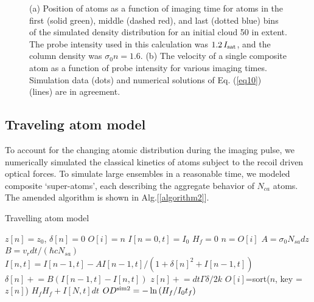 \documentclass[12pt]{iopart}
\begin{document}
\begin{figure}
\caption{(a) Position of atoms as a function of imaging time for atoms in the first (solid green), middle (dashed red), and last (dotted blue) bins of the simulated density distribution for an initial cloud 50 \um{} in extent. The probe intensity used in this calculation was $1.2\, I_{\rm{sat}}$, and the column density was $\sigma_0 n=1.6$. (b) The velocity of a single composite atom as a function of probe intensity for various imaging times. Simulation data (dots) and numerical  solutions of Eq. (\ref{eq10}) (lines) are in agreement.}  
\label{fig:simTests}
\end{figure}

\subsection{Traveling atom model}
To account for the changing atomic distribution during the imaging pulse, we numerically simulated the classical kinetics of atoms subject to the recoil driven optical forces. To simulate large ensembles in a reasonable time, we modeled composite `super-atoms', each describing the aggregate behavior of $N_{ca}$ atoms. The amended algorithm is shown in Alg.[\ref{algorithm2}]. 
\begin{algorithm}
\caption{Travelling atom model}
\label{algorithm2}
\begin{algorithmic}
\STATE $z[n]=z_0$, $\delta[n]=0$ 
\STATE $O[i]=n$ 
\STATE $I[n=0,t]=I_0$  
\STATE $H_f=0$ 
\STATE $n=O[i]$ 
 \STATE $A=\sigma_0 N_{sa} dz$ 
 \STATE $B=v_r dt/(\hbar c  N_{sa})$  
\STATE $I[n,t]=I[n-1,t] - A I[n-1,t]/(1+\delta[n]^2+I[n-1,t])$  
\STATE $\delta[n]\mathrel{+}=B\left(I[n-1,t]-I[n,t]\right)$   
\STATE $z[n]\mathrel{+}=dt\Gamma\delta/2k$ 
\ENDFOR 
\STATE $O[i]$=sort($n$, key =$z[n]$) 
\STATE $H_f H_f+ I[N,t]dt$ 
\ENDFOR
\STATE $OD^{\rm{sim2}}=-\ln{(H_f/I_0t_f)}$
\end{algorithmic}
\end{algorithm}
\end{document}

